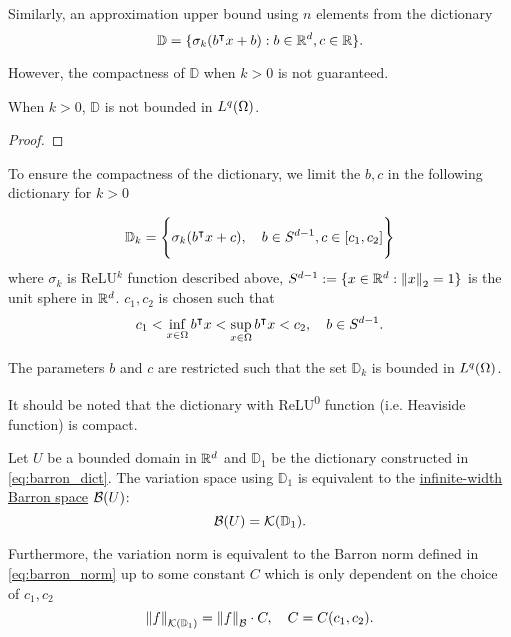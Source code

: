 Similarly, an approximation upper bound using $n$ elements from the dictionary 
\begin{equation}
    \mathbb{D} = \{
        \sigma_k(b{}^{\intercal} x + b): b\in\mathbb{R}^d, c\in\mathbb{R}
    \}.
\end{equation}

However, the compactness of $\mathbb{D}$ when $k > 0$ is not guaranteed. 

\begin{proposition}
    When $k > 0$, $\mathbb{D}$ is not bounded in $L^{q}(\Omega)$.
\end{proposition}
\begin{proof}
    
\end{proof}

To ensure the compactness of the dictionary, we limit the $b, c$ in the
following dictionary for $k>0$

\begin{equation}
    \label{eq:barron_dict}
    \mathbb{D}_{k} = \Bigg\{
        \sigma_k(b{}^{\intercal} x + c), \quad b\in S^{d-1}, c\in [c_1, c_2] 
    \Bigg\}
\end{equation}
where $\sigma_k$ is ReLU$^k$ function described above, $S^{d-1} := \{x\in\mathbb{R}^d:
\left\| x \right\|_2 = 1\}$ is the unit sphere in $\mathbb{R}^d$. $c_1, c_2$ is chosen such that
\begin{equation}
    c_1 < \inf_{x\in\Omega} b{}^{\intercal} x < 
    \sup_{x\in\Omega} b{}^{\intercal} x < c_2, \quad
    b \in S^{d-1}.
\end{equation}

The parameters $b$ and $c$ are restricted such that the set $\mathbb{D}_k$ is
bounded in $L^{q}(\Omega)$.

It should be noted that the dictionary with ReLU\textsuperscript{0} function
(i.e. Heaviside function) is compact.

\begin{proposition}
    Let $U$ be a bounded domain in $\mathbb{R}^d$ and $\mathbb{D}_1$ be the
    dictionary constructed in \eqref{eq:barron_dict}. The variation space using $\mathbb{D}_1$ is equivalent to the \hyperref[def:barron_space]{infinite-width Barron space} $\mathcal{B}(U)$:
    \begin{equation}
        \mathcal{B}(U) = \mathcal{K}({\mathbb{D}_1}).
    \end{equation}
    
    Furthermore, the variation norm is equivalent to the Barron norm defined in
    \eqref{eq:barron_norm} up to some constant $C$ which is only dependent on
    the choice of $c_1, c_2$
    \begin{equation}
        \left\| {f} \right\|_{\mathcal{K}({\mathbb{D}_1})} = \left\| f \right\|_{\mathcal{B}} \cdot C, \quad 
        C = C(c_1, c_2).
    \end{equation}
\end{proposition}

